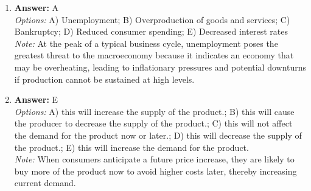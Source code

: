 \documentclass[12pt]{article}
\begin{document}
\begin{enumerate}[label=\arabic*.]
\item \textbf{Answer:} A
\\ \textit{Options:} A) Unemployment; B) Overproduction of goods and services; C) Bankruptcy; D) Reduced consumer spending; E) Decreased interest rates
\\ \textit{Note:} At the peak of a typical business cycle, unemployment poses the greatest threat to the macroeconomy because it indicates an economy that may be overheating, leading to inflationary pressures and potential downturns if production cannot be sustained at high levels.
\item \textbf{Answer:} E
\\ \textit{Options:} A) this will increase the supply of the product.; B) this will cause the producer to decrease the supply of the product.; C) this will not affect the demand for the product now or later.; D) this will decrease the supply of the product.; E) this will increase the demand for the product.
\\ \textit{Note:} When consumers anticipate a future price increase, they are likely to buy more of the product now to avoid higher costs later, thereby increasing current demand.
\end{enumerate}
\end{document}
